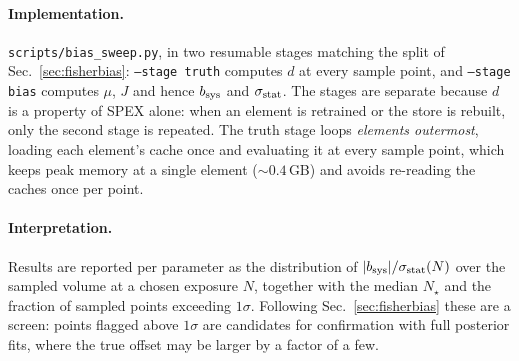 \documentclass[11pt,a4paper]{article}
\newcommand{\code}[1]{\texttt{#1}}
\begin{document}
\paragraph{Implementation.} \code{scripts/bias\_sweep.py}, in two resumable
stages matching the split of Sec.~\ref{sec:fisherbias}: \code{--stage truth}
computes $d$ at every sample point, and \code{--stage bias} computes $\mu$, $J$
and hence $b_{\rm sys}$ and $\sigma_{\rm stat}$. The stages are separate because
$d$ is a property of SPEX alone: when an element is retrained or the store is
rebuilt, only the second stage is repeated. The truth stage loops
\emph{elements outermost}, loading each element's cache once and evaluating it
at every sample point, which keeps peak memory at a single element
(${\sim}0.4$\,GB) and avoids re-reading the caches once per point.

\paragraph{Interpretation.} Results are reported per parameter as the
distribution of $|b_{\rm sys}|/\sigma_{\rm stat}(N)$ over the sampled volume at
a chosen exposure $N$, together with the median $N_\star$ and the fraction of
sampled points exceeding $1\sigma$. Following Sec.~\ref{sec:fisherbias} these
are a screen: points flagged above $1\sigma$ are candidates for confirmation
with full posterior fits, where the true offset may be larger by a factor of a
few.
\end{document}
